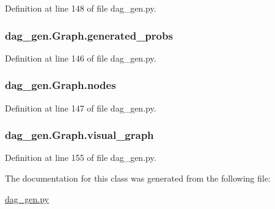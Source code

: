 Definition at line 148 of file dag\+\_\+gen.\+py.

\hypertarget{classdag__gen_1_1_graph_a28d5cae8043efce22f89f11ca36eb303}{}
\subsubsection[{generated\+\_\+probs}]{\setlength{\rightskip}{0pt plus 5cm}dag\+\_\+gen.\+Graph.\+generated\+\_\+probs}\label{classdag__gen_1_1_graph_a28d5cae8043efce22f89f11ca36eb303}


Definition at line 146 of file dag\+\_\+gen.\+py.

\hypertarget{classdag__gen_1_1_graph_a69f6f8ae5e48955976f8ec77a5df2e63}{}
\subsubsection[{nodes}]{\setlength{\rightskip}{0pt plus 5cm}dag\+\_\+gen.\+Graph.\+nodes}\label{classdag__gen_1_1_graph_a69f6f8ae5e48955976f8ec77a5df2e63}


Definition at line 147 of file dag\+\_\+gen.\+py.

\hypertarget{classdag__gen_1_1_graph_a6fa5aa97b32670d1089b5743d702083b}{}
\subsubsection[{visual\+\_\+graph}]{\setlength{\rightskip}{0pt plus 5cm}dag\+\_\+gen.\+Graph.\+visual\+\_\+graph}\label{classdag__gen_1_1_graph_a6fa5aa97b32670d1089b5743d702083b}


Definition at line 155 of file dag\+\_\+gen.\+py.



The documentation for this class was generated from the following file\+:\begin{DoxyCompactItemize}
\item 
\hyperlink{dag__gen_8py}{dag\+\_\+gen.\+py}\end{DoxyCompactItemize}
